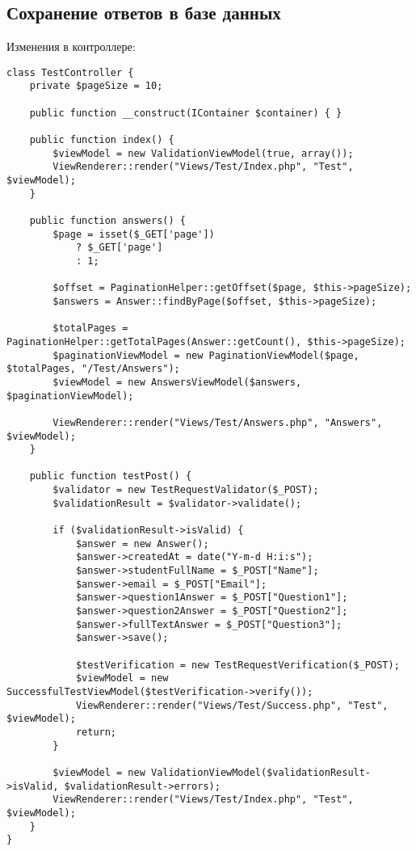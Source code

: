 \documentclass[a4paper,14pt]{extarticle}
\begin{document}
\subsection{Сохранение ответов в базе данных}
Изменения в контроллере:
\begin{lstlisting}
class TestController {
    private $pageSize = 10;

    public function __construct(IContainer $container) { }

    public function index() {
        $viewModel = new ValidationViewModel(true, array());
        ViewRenderer::render("Views/Test/Index.php", "Test", $viewModel);
    }

    public function answers() {
        $page = isset($_GET['page'])
            ? $_GET['page']
            : 1;

        $offset = PaginationHelper::getOffset($page, $this->pageSize);
        $answers = Answer::findByPage($offset, $this->pageSize);

        $totalPages = PaginationHelper::getTotalPages(Answer::getCount(), $this->pageSize);
        $paginationViewModel = new PaginationViewModel($page, $totalPages, "/Test/Answers");
        $viewModel = new AnswersViewModel($answers, $paginationViewModel);

        ViewRenderer::render("Views/Test/Answers.php", "Answers", $viewModel);
    }

    public function testPost() {
        $validator = new TestRequestValidator($_POST);
        $validationResult = $validator->validate();

        if ($validationResult->isValid) {
            $answer = new Answer();
            $answer->createdAt = date("Y-m-d H:i:s");
            $answer->studentFullName = $_POST["Name"];
            $answer->email = $_POST["Email"];
            $answer->question1Answer = $_POST["Question1"];
            $answer->question2Answer = $_POST["Question2"];
            $answer->fullTextAnswer = $_POST["Question3"];
            $answer->save();

            $testVerification = new TestRequestVerification($_POST);
            $viewModel = new SuccessfulTestViewModel($testVerification->verify());
            ViewRenderer::render("Views/Test/Success.php", "Test", $viewModel);
            return;
        }

        $viewModel = new ValidationViewModel($validationResult->isValid, $validationResult->errors);
        ViewRenderer::render("Views/Test/Index.php", "Test", $viewModel);
    }
}
\end{lstlisting}
\end{document}
